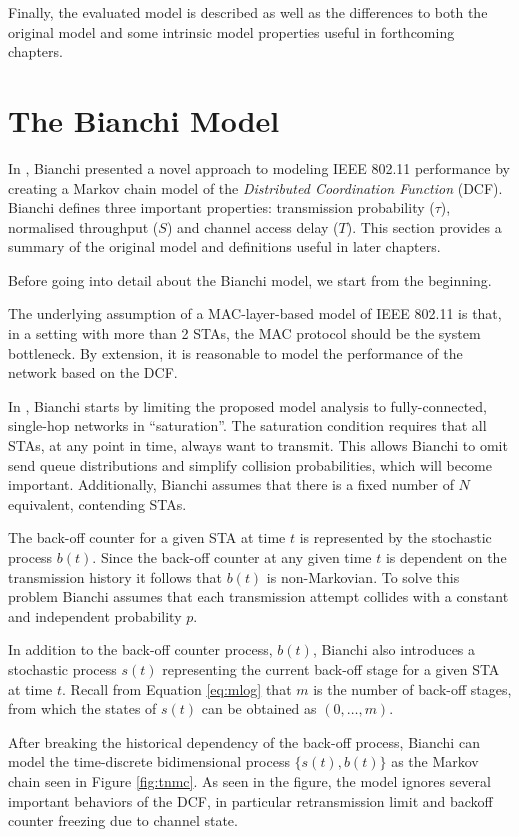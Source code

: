 Finally, the evaluated model \cite{felemban} is described as well as the
differences to both the original model \cite{bianchi} and some intrinsic model
properties useful in forthcoming chapters.

\section{The Bianchi Model}

In \cite{bianchi}, Bianchi presented a novel approach to modeling IEEE 802.11
performance by creating a Markov chain model of the \emph{Distributed
Coordination Function} (DCF). Bianchi defines three important properties:
transmission probability ($\tau$), normalised throughput ($S$) and channel
access delay ($T$). This section provides a summary of the original model and
definitions useful in later chapters.

Before going into detail about the Bianchi model, we start from the beginning.

The underlying assumption of a MAC-layer-based model of IEEE 802.11 is that,
in a setting with more than 2 STAs, the MAC protocol should be the system
bottleneck. By extension, it is reasonable to model the performance of the
network based on the DCF.

In \cite{bianchi}, Bianchi starts by limiting the proposed model analysis to
fully-connected, single-hop networks in ``saturation''. The saturation
condition requires that all STAs, at any point in time, always want to
transmit. This allows Bianchi to omit send queue distributions and simplify
collision probabilities, which will become important. Additionally, Bianchi
assumes that there is a fixed number of $N$ equivalent, contending STAs.

The back-off counter for a given STA at time $t$ is represented by the
stochastic process $b(t)$. Since the back-off counter at any given time $t$ is
dependent on the transmission history it follows that $b(t)$ is non-Markovian.
To solve this problem Bianchi assumes that each transmission attempt collides
with a constant and independent probability $p$.

In addition to the back-off counter process, $b(t)$, Bianchi also introduces a
stochastic process $s(t)$ representing the current back-off stage for a given
STA at time $t$. Recall from Equation \ref{eq:mlog} that $m$ is the number of
back-off stages, from which the states of $s(t)$ can be obtained as $(0,
\dots, m)$.

After breaking the historical dependency of the back-off process, Bianchi can
model the time-discrete bidimensional process $\{s(t), b(t)\}$ as the Markov
chain seen in Figure \ref{fig:tnmc}. As seen in the figure, the model ignores
several important behaviors of the DCF, in particular retransmission limit and
backoff counter freezing due to channel state.

